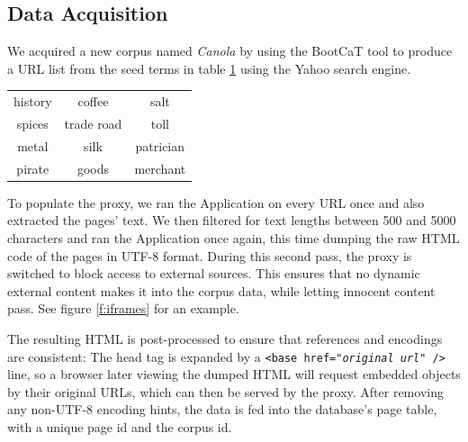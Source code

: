 \subsection{Data Acquisition\label{datagather}}

We acquired a new corpus named \textit{Canola} by using the BootCaT \cite{bootcat} tool to produce a URL list from the seed terms in table \ref{t:seed} using the Yahoo search engine. 

\begin{table}
\centering
{}
\begin{tabular}[h]{ccc}
        history
&        coffee 
&        salt \\
        spices 
&        trade road
&        toll \\
        metal
&        silk 
&        patrician \\
        pirate 
&        goods
&        merchant 
\end{tabular}
\label{t:seed}
\end{table}


To populate the proxy, we ran the Application on every URL once and also extracted the pages' text.
We then filtered for text lengths between 500 and 5000 characters and ran the Application once again, this time dumping the raw HTML code of the pages in UTF-8 format.
During this second pass, the proxy is switched to block access to external sources.
This ensures that no dynamic external content makes it into the corpus data, while letting innocent content pass.
See figure \ref{f:iframes} for an example.


The resulting HTML is post-processed to ensure that references and encodings are consistent:
The head tag is expanded by a \texttt{<base href="\textit{original url}" />} line, so a browser later viewing the dumped HTML will request embedded objects by their original URLs, which can then be served by the proxy.
After removing any non-UTF-8 encoding hints, the data is fed into the database's page table, with a unique page id and the corpus id.

